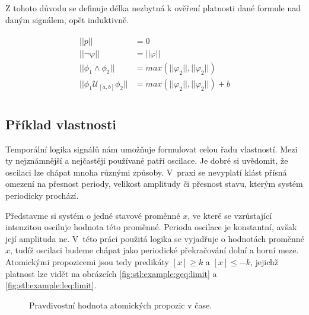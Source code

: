 Z tohoto důvodu se definuje délka nezbytná k ověření platnosti dané formule nad daným signálem,
opět induktivně.

\begin{align}\label{eq:stl:min:length}
\begin{array}{ll}
||p||									&= 0									\\
||\neg\varphi||							&= ||\varphi||							\\
||\phi_1 \wedge \phi_2||				&= max(||\varphi_2||,||\varphi_2||) 	\\
||\phi_1 \mathcal{U}_{[a,b]} \phi_2||	&= max(||\varphi_2||,||\varphi_2||) + b	\\
\end{array}
\end{align}

\subsection{Příklad vlastnosti}\label{section:stl:example}

Temporální logika signálů nám umožňuje formulovat celou řadu vlastností. Mezi ty
nejznámnější a nejčastěji používané patří oscilace. Je dobré si u\-vě\-do\-mit, že oscilaci
lze chápat mnoha různými způsoby. V~praxi se nevyplatí klást přísná omezení na přesnost
periody, velikost amplitudy či přesnost stavu, kterým systém periodicky prochází. 

Představme si systém o jedné stavové proměnné $x$, ve které se vzrů\-sta\-jí\-cí intenzitou
osciluje hodnota této proměnné. Perioda oscilace je konstantní, avšak její amplituda ne. V~této práci
použitá logika se vyjadřuje o hodnotách proměnné $x$, tudíž oscilaci budeme
chápat jako periodické pře\-kra\-čo\-vá\-ní dolní a horní meze. Atomickými propozicemi jsou tedy
predikáty $[x] \geq k$ a $[x] \leq -k$, jejichž platnost lze vidět na obrázcích
\ref{fig:stl:example:geq:limit} a \ref{fig:stl:example:leq:limit}.

\begin{figure}[t]
\begin{center}
\caption{Pravdivostní hodnota atomických propozic v čase.}
\end{center}
\end{figure}

